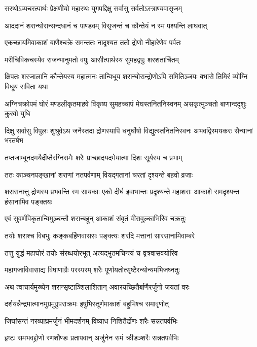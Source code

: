 \twolineshloka
{सरथोऽप्यचरत्पार्थः प्रेक्षणीयो महारथः}
{युगपद्दिक्षु सर्वासु सर्वतोऽस्त्राण्यवासृजम्}


\twolineshloka
{आददानं शरान्घोरान्सन्दधानं च पाण्डवम्}
{विसृजन्तं च कौन्तेयं न स्म पश्यन्ति लाघवात्}


\twolineshloka
{एकच्छायमिवाकाशं बाणैश्चक्रे समन्ततः}
{नादृश्यत ततो द्रोणो नीहारेणेव पर्वतः}


\twolineshloka
{मरीचिविकचस्येव राजन्भानुमतो वपुः}
{आसीत्पार्थस्य सुमहद्वपुः शरशतार्चितम्}


\threelineshloka
{क्षिपतः शरजालानि कौन्तेयस्य महात्मनः}
{तान्विधूय शरान्घोरान्द्रोणोऽपि समितिञ्जयः}
{बभासे तिमिरं व्योम्नि विधूय सविता यथा}


\threelineshloka
{अग्निचक्रोपमं घोरं मण्डलीकृतमाहवे}
{विकृष्य सुमहच्चापं मेघस्तनितनिस्वनम्}
{असकृत्मुञ्चतो बाणान्ददृशुः कुरवो युधि}


\threelineshloka
{दिक्षु सर्वासु विपुलः शुश्रुवेऽथ जनैस्तदा}
{द्रोणस्यापि धनुर्घोषो विद्युत्स्तनितनिस्वनः}
{अभवद्विस्मयकरः सैन्यानां भरतर्षभ}


\twolineshloka
{तप्तजाम्बूनदमयैर्दीप्तैरग्निसमैः शरैः}
{प्राच्छादयदमेयात्मा दिशः सूर्यस्य च प्रभाम्}


\twolineshloka
{ततः काञ्चनपङ्खानां शराणां नतपर्वणाम्}
{वियद्गतानां चरतां दृश्यन्ते बहवो व्रजाः}


\threelineshloka
{शरासनात्तु द्रोणस्य प्रभवन्ति स्म सायकाः}
{एको दीर्घ इवाभान्तः प्रदृश्यन्ते महाशराः}
{आकाशे समदृश्यन्त हंसानामिव पङ्क्तयः}


\twolineshloka
{एवं सुवर्णविकृतान्विमुञ्चन्तौ शरान्बहून्}
{आकाशं संवृतं वीरावुल्काभिरिव चक्रतुः}


\twolineshloka
{तयोः शराश्च विबभुः कङ्कबर्हिणवाससः}
{पङ्क्त्यः शरदि मत्तानां सारसानामिवाम्बरे}


\twolineshloka
{तत्तु युद्धं महाघोरं तयोः संरब्धयोरभूत्}
{अत्यद्भुतमचिन्त्यं च वृत्रवासवयोरिव}


\twolineshloka
{महागजाविवासाद्य विषाणाग्रैः परस्परम्}
{शरैः पूर्णायतोत्सृष्टैरन्योन्यमभिजघ्नतुः}


\twolineshloka
{अथ त्वाचार्यमुख्येन शरान्सृष्टाञ्शिलाशितान्}
{अवारयच्छितैर्बाणैरर्जुनो जयतां वरः}


\twolineshloka
{दर्शयन्नैन्द्रमात्मानमुग्रमुग्रुपराक्रमः}
{इषुभिस्तूर्णमाकाशं बहुभिश्च समावृणोत्}



\twolineshloka
{जिघांसन्तं नरव्याघ्रमर्जुनं भीमदर्शनम्}
{विव्याध निशितैर्द्रोणः शरैः सन्नतपर्वभिः}


\twolineshloka
{हृष्टः समभवद्द्रोणो रणशौण्डः प्रतापवान्}
{अर्जुनेन समं क्रीडञ्शरैः सन्नतपर्वभिः}


